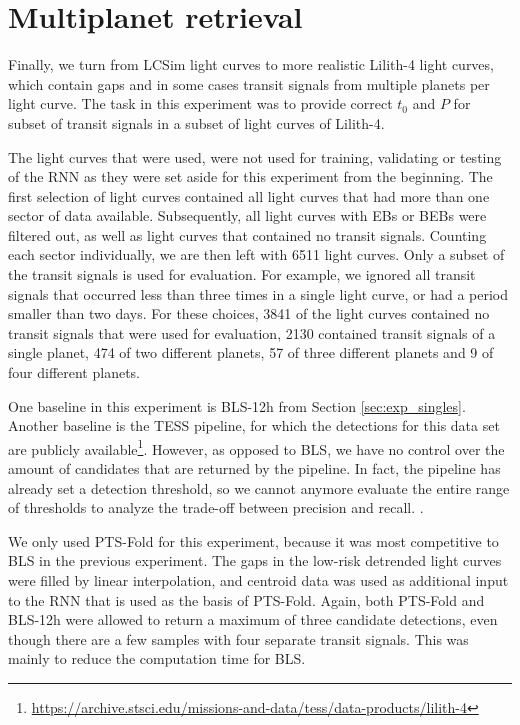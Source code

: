 
\section{Multiplanet retrieval}
\label{sec:exp_multis}

Finally, we turn from LCSim light curves to more realistic Lilith-4 light curves, which contain gaps and in some cases transit signals from multiple planets per light curve. The task in this experiment was to provide correct $t_0$ and $P$ for subset of transit signals in a subset of light curves of Lilith-4. 

The light curves that were used, were not used for training, validating or testing of the RNN as they were set aside for this experiment from the beginning. The first selection of light curves contained all light curves that had more than one sector of data available. Subsequently, all light curves with EBs or BEBs were filtered out, as well as light curves that contained no transit signals. Counting each sector individually, we are then left with 6511 light curves. Only a subset of the transit signals is used for evaluation. For example, we ignored all transit signals that occurred less than three times in a single light curve, or had a period smaller than two days. For these choices, 3841 of the light curves contained no transit signals that were used for evaluation, 2130 contained transit signals of a single planet, 474 of two different planets, 57 of three different planets and 9 of four different planets.

One baseline in this experiment is BLS-12h from Section \ref{sec:exp_singles}. Another baseline is the TESS pipeline, for which the detections for this data set are publicly available\footnote{\url{https://archive.stsci.edu/missions-and-data/tess/data-products/lilith-4}}. However, as opposed to BLS, we have no control over the amount of candidates that are returned by the pipeline. In fact, the pipeline has already set a detection threshold, so we cannot anymore evaluate the entire range of thresholds to analyze the trade-off between precision and recall. .

We only used PTS-Fold for this experiment, because it was most competitive to BLS in the previous experiment. The gaps in the low-risk detrended light curves were filled by linear interpolation, and centroid data was used as additional input to the RNN that is used as the basis of PTS-Fold. Again, both PTS-Fold and BLS-12h were allowed to return a maximum of three candidate detections, even though there are a few samples with four separate transit signals. This was mainly to reduce the computation time for BLS.

